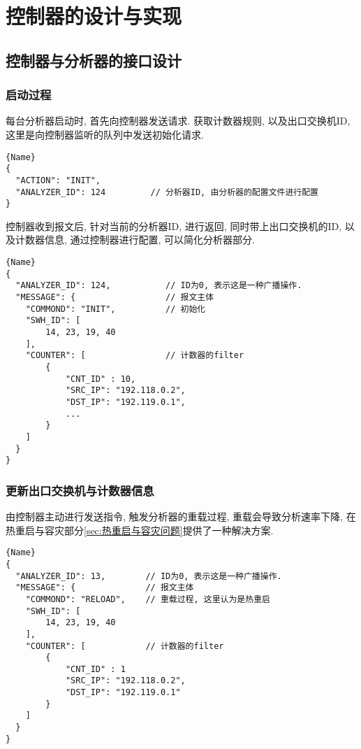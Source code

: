 
\chapter{控制器的设计与实现}

\section{控制器与分析器的接口设计}
\label{sec:分析器, 控制器接口设计}

\subsection{启动过程}

每台分析器启动时, 首先向控制器发送请求. 获取计数器规则, 以及出口交换机ID,
这里是向控制器监听的队列中发送初始化请求.

\begin{lstlisting}[caption=分析器初始化请求]{Name}
{
  "ACTION": "INIT",
  "ANALYZER_ID": 124         // 分析器ID, 由分析器的配置文件进行配置
}
\end{lstlisting}

控制器收到报文后, 针对当前的分析器ID, 进行返回, 同时带上出口交换机的ID,
以及计数器信息, 通过控制器进行配置, 可以简化分析器部分.

\begin{lstlisting}[caption=控制器返回报文]{Name}
{
  "ANALYZER_ID": 124,           // ID为0, 表示这是一种广播操作.
  "MESSAGE": {                  // 报文主体
    "COMMOND": "INIT",          // 初始化
    "SWH_ID": [
        14, 23, 19, 40
    ],
    "COUNTER": [                // 计数器的filter
        {
            "CNT_ID" : 10,
            "SRC_IP": "192.118.0.2",
            "DST_IP": "192.119.0.1",
            ...
        }
    ]
  }
}
\end{lstlisting}

\subsection{更新出口交换机与计数器信息}

由控制器主动进行发送指令, 触发分析器的重载过程, 重载会导致分析速率下降,
在热重启与容灾部分\ref{sec:热重启与容灾问题}提供了一种解决方案.

\begin{lstlisting}[caption=控制器下发指令]{Name}
{
  "ANALYZER_ID": 13,        // ID为0, 表示这是一种广播操作.
  "MESSAGE": {              // 报文主体
    "COMMOND": "RELOAD",    // 重载过程, 这里认为是热重启
    "SWH_ID": [
        14, 23, 19, 40
    ],
    "COUNTER": [            // 计数器的filter
        {
            "CNT_ID" : 1
            "SRC_IP": "192.118.0.2",
            "DST_IP": "192.119.0.1"
        }
    ]
  }
}
\end{lstlisting}


